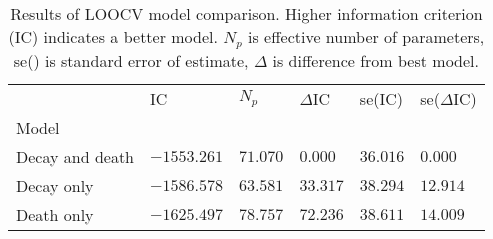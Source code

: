 \begin{table} \centering \caption{Results of LOOCV model comparison. Higher information criterion (IC) indicates a better model. $N_p$ is effective number of parameters, se() is standard error of estimate, $\Delta$ is difference from best model.} \label{loo_table} \begin{tabular}{llllll} \toprule {} & IC & $N_p$ & $\Delta$IC & se(IC) & se($\Delta$IC) \\ Model & & & & & \\ \midrule Decay and death & $-1553.261$ & $71.070$ & $0.000$ & $36.016$ & $0.000$ \\ Decay only & $-1586.578$ & $63.581$ & $33.317$ & $38.294$ & $12.914$ \\ Death only & $-1625.497$ & $78.757$ & $72.236$ & $38.611$ & $14.009$ \\ \bottomrule \end{tabular} \end{table}